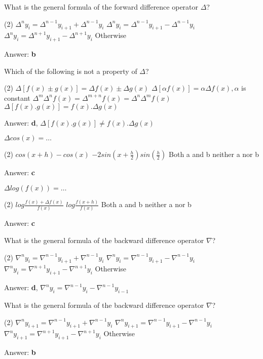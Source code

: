 \documentclass{exam}
\begin{document}
\begin{questions}
	\question What is the general formula of the forward difference operator $\Delta$?
	\begin{tasks}(2)
		\task $\Delta^n y_i = \Delta^{n-1} y_{i+1} + \Delta^{n-1} y_i$
		\task $\Delta^n y_i = \Delta^{n-1} y_{i+1} - \Delta^{n-1} y_i$
		\task $\Delta^n y_i = \Delta^{n+1} y_{i+1} - \Delta^{n+1} y_i$
		\task Otherwise
	\end{tasks}
	Answer: \textbf{b}

	\question Which of the following is not a property of $\Delta$?
	\begin{tasks}(2)
		\task $\Delta[f(x) \pm g(x)]=\Delta f(x) \pm \Delta g(x)$
		\task $\Delta[\alpha f(x)] = \alpha \Delta f(x), \alpha $ is constant
		\task $\Delta^m \Delta^n f(x) = \Delta^{m+n} f(x) = \Delta^n \Delta^m f(x)$
		\task $\Delta[f(x).g(x)] = f(x).\Delta g(x)$
	\end{tasks}
	Answer: \textbf{d}, $\Delta[f(x).g(x)] \ne f(x).\Delta g(x)$

	\question $\Delta cos(x) = \dots$
	\begin{tasks}(2)
		\task $cos(x+h)-cos(x)$
		\task $-2 sin(x+\frac{h}{2}) sin(\frac{h}{2})$
		\task Both a and b
		\task neither a nor b
	\end{tasks}
	Answer: \textbf{c}

	\question $\Delta log(f(x)) = \dots$
	\begin{tasks}(2)
		\task $log \frac{f(x)+\Delta f(x)}{f(x)} $
		\task $log \frac{f(x+h)}{f(x)} $
		\task Both a and b
		\task neither a nor b
	\end{tasks}
	Answer: \textbf{c}

	\question What is the general formula of the backward difference operator $\nabla$?
	\begin{tasks}(2)
		\task $\nabla^n y_i = \nabla^{n-1} y_{i+1} + \nabla^{n-1} y_i$
		\task $\nabla^n y_i = \nabla^{n-1} y_{i+1} - \nabla^{n-1} y_i$
		\task $\nabla^n y_i = \nabla^{n+1} y_{i+1} - \nabla^{n+1} y_i$
		\task Otherwise
	\end{tasks}
	Answer: \textbf{d}, $\nabla^n y_i = \nabla^{n-1} y_i - \nabla^{n-1} y_{i-1}$

	\question What is the general formula of the backward difference operator $\nabla$?
	\begin{tasks}(2)
		\task $\nabla^n y_{i+1} = \nabla^{n-1} y_{i+1} + \nabla^{n-1} y_i$
		\task $\nabla^n y_{i+1} = \nabla^{n-1} y_{i+1} - \nabla^{n-1} y_i$
		\task $\nabla^n y_{i+1} = \nabla^{n+1} y_{i+1} - \nabla^{n+1} y_i$
		\task Otherwise
	\end{tasks}
	Answer: \textbf{b}


\end{questions}
\end{document}
